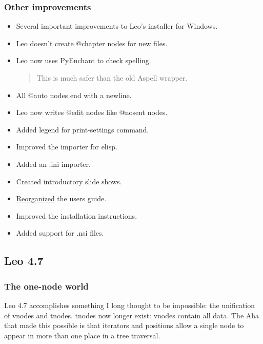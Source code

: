 \documentclass[a4paper,10pt,english]{sphinxmanual}
\begin{document}
\subsubsection{Other improvements}
\label{what-is-new:other-improvements}\begin{itemize}
\item {} 
Several important improvements to Leo's installer for Windows.

\item {} 
Leo doesn't create @chapter nodes for new files.

\item {} 
Leo now uses PyEnchant to check spelling.
\begin{quote}

This is much safer than the old Aspell wrapper.
\end{quote}

\item {} 
All @auto nodes end with a newline.

\item {} 
Leo now writes @edit nodes like @nosent nodes.

\item {} 
Added legend for print-settings command.

\item {} 
Improved the importer for elisp.

\item {} 
Added an .ini importer.

\item {} 
Created introductory slide shows.

\item {} 
\href{http://groups.google.com/group/leo-editor/browse\_thread/thread/d02df89c0b831a7c}{Reorganized} the users guide.

\item {} 
Improved the installation instructions.

\item {} 
Added support for .nsi files.

\end{itemize}


\subsection{Leo 4.7}
\label{what-is-new:leo-4-7}

\subsubsection{The one-node world}
\label{what-is-new:the-one-node-world}
Leo 4.7 accomplishes something I long thought to be impossible: the unification
of vnodes and tnodes. tnodes now longer exist: vnodes contain all data. The Aha
that made this possible is that iterators and positions allow a single node to
appear in more than one place in a tree traversal.
\end{document}
